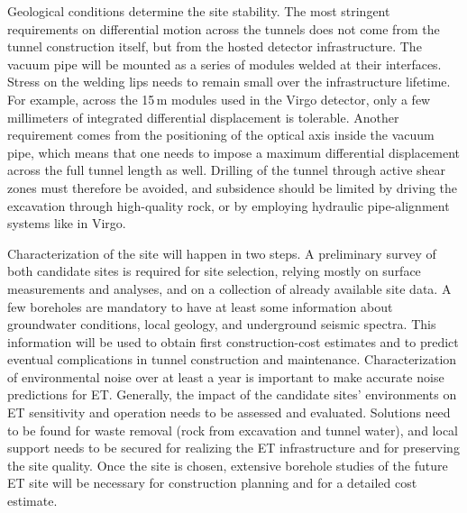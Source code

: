 Geological conditions determine the site stability. The most stringent requirements on differential motion across the tunnels does not come from the tunnel construction itself, but from the hosted detector infrastructure. The vacuum pipe will be mounted as a series of modules welded at their interfaces. Stress on the welding lips needs to remain small over the infrastructure lifetime. For example, across the 15\,m modules used in the Virgo detector, only a few millimeters of integrated differential displacement is tolerable. Another requirement comes from the positioning of the optical axis inside the vacuum pipe, which means that one needs to impose a maximum differential displacement across the full tunnel length as well. Drilling of the tunnel through active shear zones must therefore be avoided, and subsidence should be limited by driving the excavation through high-quality rock, or by employing hydraulic pipe-alignment systems like in Virgo.

Characterization of the site will happen in two steps. A preliminary survey of both candidate sites is required for site selection, relying mostly on surface measurements and analyses, and on a collection of already available site data. A few boreholes are mandatory to have at least some information about groundwater conditions, local geology, and underground seismic spectra. This information will be used to obtain first construction-cost estimates and to predict eventual complications in tunnel construction and maintenance. Characterization of environmental noise over at least a year is important to make accurate noise predictions for ET. Generally, the impact of the candidate sites' environments on ET sensitivity and operation needs to be assessed and evaluated. Solutions need to be found for waste removal (rock from excavation and tunnel water), and local support needs to be secured for realizing the ET infrastructure and for preserving the site quality. Once the site is chosen, extensive borehole studies of the future ET site will be necessary for construction planning and for a detailed cost estimate. 

